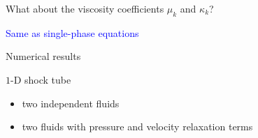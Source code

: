 \documentclass[xcolor=dvipsnames,10pt]{beamer}
\newcommand{\resi}{R}
\newcommand{\resinew}{\widetilde{\resi}}
\newcommand{\grad}{\vec{\nabla}}
\newcommand{\norm}{\textrm{norm}}
\begin{document}
\begin{frame}{What about the viscosity coefficients $\mu_k$ and $\kappa_k$?}
\begin{center}
\textcolor{blue}{\Large{Same as single-phase equations}}
\end{center}
\end{frame}
\begin{frame}{Numerical results}
\begin{block}{$1$-D shock tube}
\begin{itemize}
\setlength{\itemsep}{10pt}
\item two independent fluids
\item two fluids with pressure and velocity relaxation terms
\end{itemize}
\end{block}
\end{frame}
\end{document}
